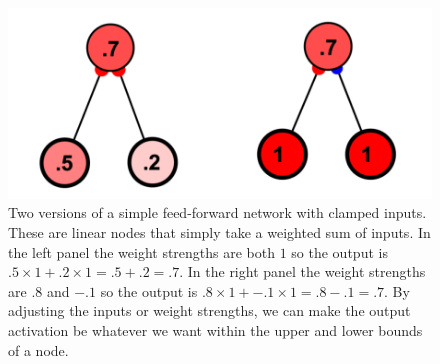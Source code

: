 \begin{figure}[h]
\centering
\includegraphics[scale=.25]{./images/2NodeSimpleFF.png}
\caption[Simbrain screenshot.]{Two versions of a simple feed-forward network with clamped inputs. These are linear nodes that simply take a weighted sum of inputs.  In the left panel the weight strengths are both $1$ so the output is $.5 \times 1 + .2 \times 1 = .5+.2 = .7$. In the right panel the weight strengths are $.8$ and $-.1$ so the output is $.8 \times 1 + -.1 \times 1 = .8 - .1 = .7$. By adjusting the inputs or weight strengths, we can make the output activation be whatever we want within the upper and lower bounds of a node. }
\label{2NodeSimpleFF}
\end{figure}

